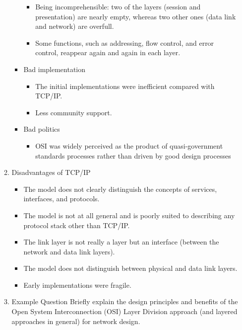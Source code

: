 \documentclass[a4paper,10pt]{article}
\begin{document}
\begin{enumerate}
\begin{enumerate}
\begin{itemize}
            \begin{itemize}
              \item Being incomprehensible: two of the layers (session and presentation) are nearly empty, whereas two other ones (data link and network) are overfull.
              \item Some functions, such as addressing, flow control, and error control, reappear again and again in each layer.
            \end{itemize}
          \item Bad implementation
            \begin{itemize}
              \item The initial implementations were inefficient compared with TCP/IP.
              \item Less community support.
            \end{itemize}
          \item Bad politics
            \begin{itemize}
              \item OSI was widely perceived as the product of quasi-government standards processes rather than driven by good design processes
            \end{itemize}
        \end{itemize}
      \item Disadvantages of TCP/IP
        \begin{itemize}
          \item The model does not clearly distinguish the concepts of services, interfaces, and protocols.
          \item The model is not at all general and is poorly suited to describing any protocol stack other than TCP/IP.
          \item The link layer is not really a layer but an interface (between the network and data link layers).
          \item The model does not distinguish between physical and data link layers.
          \item Early implementations were fragile.
        \end{itemize}
      \item Example Question
        \newline Briefly explain the design principles and benefits of the Open System Interconnection (OSI) Layer Division approach (and layered approaches in general) for network design.
        \begin{enumerate}

\end{enumerate}
\end{enumerate}
\end{enumerate}
\end{document}
